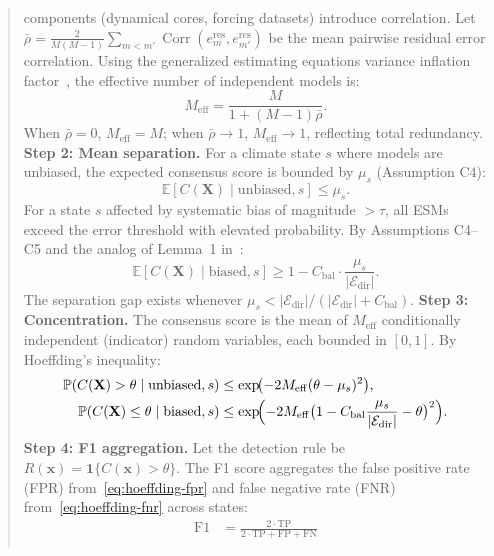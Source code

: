 \documentclass[11pt,a4paper]{article}
\theoremstyle{plain}
\theoremstyle{definition}
\theoremstyle{remark}
\DeclareMathOperator{\Corr}{Corr}
\newcommand{\E}{\mathbb{E}}
\newcommand{\Pbb}{\mathbb{P}}
\newcommand{\ind}[1]{\mathbf{1}\{#1\}}
\begin{document}
\begin{abstract}
components (dynamical cores, forcing datasets) introduce correlation.
Let $\bar{\rho} = \frac{2}{M(M-1)}\sum_{m<m'} \Corr(e_m^{\mathrm{res}}, e_{m'}^{\mathrm{res}})$
be the mean pairwise residual error correlation. Using the generalized
estimating equations variance inflation factor~\cite{liang1986}, the effective
number of independent models is:
\begin{equation}
M_{\mathrm{eff}} = \frac{M}{1 + (M-1)\bar{\rho}}.
\end{equation}
When $\bar{\rho} = 0$, $M_{\mathrm{eff}} = M$; when $\bar{\rho} \to 1$,
$M_{\mathrm{eff}} \to 1$, reflecting total redundancy.
\medskip\noindent\textbf{Step 2: Mean separation.}
For a climate state $s$ where models are unbiased, the expected consensus score
is bounded by $\mu_s$ (Assumption C4):
\begin{equation}
\E[C(\mathbf{X}) \mid \text{unbiased}, s] \leq \mu_s.
\end{equation}
For a state $s$ affected by systematic bias of magnitude $> \tau$, all ESMs
exceed the error threshold with elevated probability. By Assumptions C4--C5
and the analog of Lemma~1 in~\cite{xi2025scx}:
\begin{equation}
\E[C(\mathbf{X}) \mid \text{biased}, s] \geq 1 - C_{\mathrm{bal}} \cdot
\frac{\mu_s}{|\mathcal{E}_{\mathrm{dir}}|}.
\end{equation}
The separation gap exists whenever
$\mu_s < |\mathcal{E}_{\mathrm{dir}}| / (|\mathcal{E}_{\mathrm{dir}}| + C_{\mathrm{bal}})$.
\medskip\noindent\textbf{Step 3: Concentration.}
The consensus score is the mean of $M_{\mathrm{eff}}$ conditionally independent
(indicator) random variables, each bounded in $[0,1]$. By Hoeffding's inequality:
\begin{align}
\Pbb(C(\mathbf{X}) > \theta \mid \text{unbiased}, s)
&\leq \exp\!\bigl(-2M_{\mathrm{eff}}(\theta - \mu_s)^2\bigr), \label{eq:hoeffding-fpr} \\
\Pbb(C(\mathbf{X}) \leq \theta \mid \text{biased}, s)
&\leq \exp\!\Bigl(-2M_{\mathrm{eff}}\bigl(1 - C_{\mathrm{bal}}\frac{\mu_s}{|\mathcal{E}_{\mathrm{dir}}|} - \theta\bigr)^2\Bigr). \label{eq:hoeffding-fnr}
\end{align}
\medskip\noindent\textbf{Step 4: F1 aggregation.}
Let the detection rule be $R(\mathbf{x}) = \ind{C(\mathbf{x}) > \theta}$.
The F1 score aggregates the false positive rate (FPR) from~\eqref{eq:hoeffding-fpr}
and false negative rate (FNR) from~\eqref{eq:hoeffding-fnr} across states:
\begin{align}
\mathrm{F1} &= \frac{2 \cdot \mathrm{TP}}{2 \cdot \mathrm{TP} + \mathrm{FP} + \mathrm{FN}} \\

\end{align}
\end{abstract}
\end{document}
